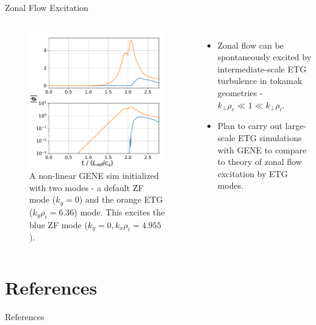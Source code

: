 \documentclass[aspectratio=43]{beamer}
\begin{document}
   \begin{frame}{Zonal Flow Excitation}
      \begin{columns}
            \begin{figure}
               \vspace*{-.6cm}\includegraphics[scale=.35]{Images/zonalFlow.pdf}
               \caption{A non-linear GENE sim initialized with two modes - a default ZF mode ($k_y=0$) and
                        the orange ETG ($k_y\rho_i=6.36$) mode. This excites the blue ZF mode ($k_y=0,k_x\rho_i=4.955$).}
            \end{figure}
            \vspace*{-.5cm}
            \begin{itemize}
               \item Zonal flow can be spontaneously excited by intermediate-scale ETG turbulence in tokamak geometries - 
               $k_{\perp}\rho_e \ll 1 \ll k_{\perp}\rho_i$.
               \item Plan to carry out large-scale ETG simulations with GENE to compare to theory of zonal flow excitation by ETG modes.
            \end{itemize}
      \end{columns}
   \end{frame}
   
   \section*{References}
      \begin{frame}{References}
      \end{frame}
\end{document}
